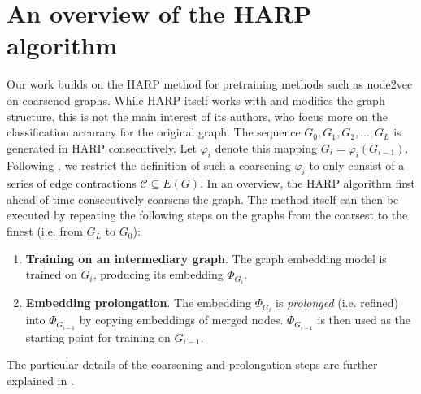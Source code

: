 \section{An overview of the HARP algorithm}\label{sec:harp}

Our work builds on the HARP method \cite{chen_harp_2018} for pretraining methods such as node2vec \cite{grover_node2vec_2016} on coarsened graphs. While HARP itself works with and modifies the graph structure, this is not the main interest of its authors, who focus more on the classification accuracy for the original graph. The sequence \( G_0, G_1, G_2, \dots, G_L \) is generated in HARP consecutively. Let \( \varphi_i \) denote this mapping \( G_i = \varphi_i \left( G_{i - 1} \right) \). Following \cite{schulz_mining_2019}, we restrict the definition of such a coarsening \( \varphi_i \) to only consist of a series of edge contractions \( \mathcal{C} \subseteq E \left( G \right) \). In an overview, the HARP algorithm first ahead-of-time consecutively coarsens the graph. The method itself can then be executed by repeating the following steps on the graphs from the coarsest to the finest (i.e. from \( G_L \) to \( G_0 \)):
\begin{enumerate}
  \item \textbf{Training on an intermediary graph}. The graph embedding model is trained on \( G_i \), producing its embedding \( \Phi_{G_i} \).
  \item \textbf{Embedding prolongation}. The embedding \( \Phi_{G_i} \) is \textit{prolonged} (i.e. refined) into \( \Phi_{G_{i - 1}} \) by copying embeddings of merged nodes. \( \Phi_{G_{i - 1}} \) is then used as the starting point for training on \( G_{i - 1} \).
\end{enumerate}
The particular details of the coarsening and prolongation steps are further explained in \cite{chen_harp_2018}.
